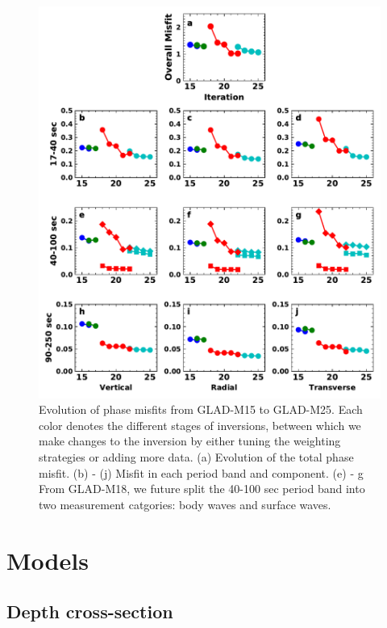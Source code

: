 \documentclass[extra,mreferee]{gji}
\begin{document}
\begin{figure}
  \centering
  \includegraphics[width=\textwidth]{figures/misfit.pdf}
  \caption{Evolution of phase misfits from GLAD-M15 to GLAD-M25. Each color denotes the different stages of inversions, between which we make changes to the inversion by either tuning the weighting strategies or adding more data. (a) Evolution of the total phase misfit. (b) - (j) Misfit in each period band and component. (e) - {g} From GLAD-M18, we future split the 40-100 sec period band into two measurement  catgories: body waves and surface waves.}
\end{figure}


\section{Models}

\subsection{Depth cross-section}
\end{document}
